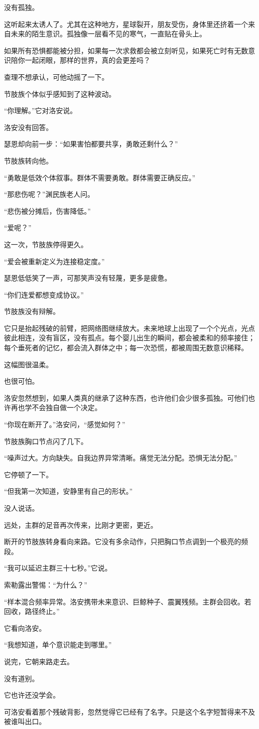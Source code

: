 没有孤独。

这听起来太诱人了。尤其在这种地方，星球裂开，朋友受伤，身体里还挤着一个来自未来的陌生意识。孤独像一层看不见的寒气，一直贴在骨头上。

如果所有恐惧都能被分担，如果每一次求救都会被立刻听见，如果死亡时有无数意识陪你一起闭眼，那样的世界，真的会更差吗？

查理不想承认，可他动摇了一下。

节肢族个体似乎感知到了这种波动。

“你理解。”它对洛安说。

洛安没有回答。

瑟恩却向前一步：“如果害怕都要共享，勇敢还剩什么？”

节肢族转向他。

“勇敢是低效个体叙事。群体不需要勇敢。群体需要正确反应。”

“那悲伤呢？”渊民族老人问。

“悲伤被分摊后，伤害降低。”

“爱呢？”

这一次，节肢族停得更久。

“爱会被重新定义为连接稳定度。”

瑟恩低低笑了一声，可那笑声没有轻蔑，更多是疲惫。

“你们连爱都想变成协议。”

节肢族没有辩解。

它只是抬起残破的前臂，把网络图继续放大。未来地球上出现了一个个光点，光点彼此相连，没有盲区，没有孤点。每个婴儿出生的瞬间，都会被柔和的频率接住；每个垂死者的记忆，都会流入群体之中；每一次恐慌，都被周围无数意识稀释。

这幅图很温柔。

也很可怕。

洛安忽然想到，如果人类真的继承了这种东西，也许他们会少很多孤独。可他们也许再也学不会独自做一个决定。

“你现在断开了。”洛安问，“感觉如何？”

节肢族胸口节点闪了几下。

“噪声过大。方向缺失。自我边界异常清晰。痛觉无法分配。恐惧无法分配。”

它停顿了一下。

“但我第一次知道，安静里有自己的形状。”

没人说话。

远处，主群的足音再次传来，比刚才更密，更近。

断开的节肢族转身看向来路。它没有多余动作，只把胸口节点调到一个极亮的频段。

“我可以延迟主群三十七秒。”它说。

索勒露出警惕：“为什么？”

“样本混合频率异常。洛安携带未来意识、巨鲸种子、震翼残频。主群会回收。若回收，路径终止。”

它看向洛安。

“我想知道，单个意识能走到哪里。”

说完，它朝来路走去。

没有道别。

它也许还没学会。

可洛安看着那个残破背影，忽然觉得它已经有了名字。只是这个名字短暂得来不及被谁叫出口。
